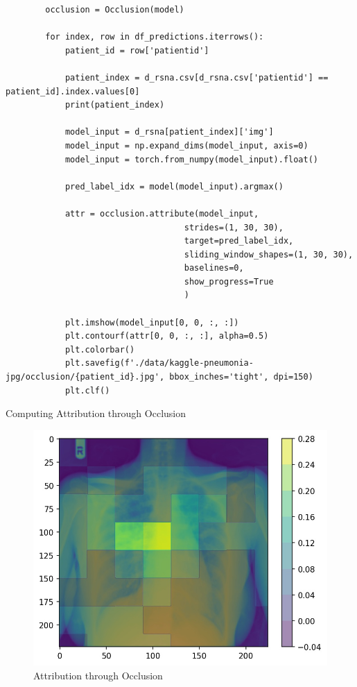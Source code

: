 \documentclass[11pt,a4paper,english]{scrreprt}
\begin{document}
\begin{listing}[htpb]
    \begin{verbatim}
        occlusion = Occlusion(model)

        for index, row in df_predictions.iterrows():
            patient_id = row['patientid']

            patient_index = d_rsna.csv[d_rsna.csv['patientid'] == patient_id].index.values[0]
            print(patient_index)

            model_input = d_rsna[patient_index]['img']
            model_input = np.expand_dims(model_input, axis=0)
            model_input = torch.from_numpy(model_input).float()

            pred_label_idx = model(model_input).argmax()

            attr = occlusion.attribute(model_input,
                                    strides=(1, 30, 30),
                                    target=pred_label_idx,
                                    sliding_window_shapes=(1, 30, 30),
                                    baselines=0,
                                    show_progress=True
                                    )

            plt.imshow(model_input[0, 0, :, :])
            plt.contourf(attr[0, 0, :, :], alpha=0.5)
            plt.colorbar()
            plt.savefig(f'./data/kaggle-pneumonia-jpg/occlusion/{patient_id}.jpg', bbox_inches='tight', dpi=150)
            plt.clf()
    \end{verbatim}
    \caption{Computing Attribution through Occlusion}
    \label{listing:occlusion}
\end{listing}

\begin{figure}[htbp]
    \centering
    \includegraphics[width=\textwidth]{img/occlusion.jpg}
    \caption{Attribution through Occlusion}
    \label{fig:occlusion}
\end{figure}
\end{document}
